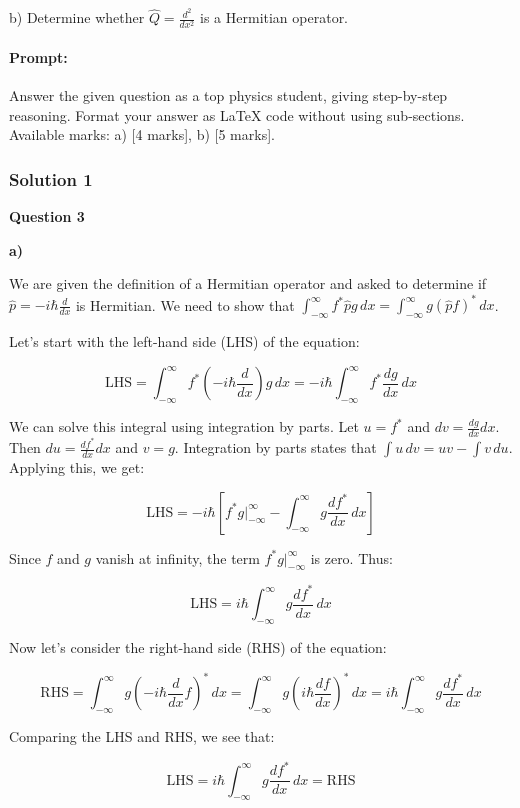 \documentclass{article}
\begin{document}
b) Determine whether $\hat{Q} = \frac{d^2}{dx^2}$ is a Hermitian operator.

\paragraph{Prompt: \\} 
Answer the given question as a top physics student, giving step-by-step reasoning. Format your answer as LaTeX code without using sub-sections. Available marks: a) [4 marks], b) [5 marks].

\subsubsection{Solution 1}
\textbf{Question 3}

\textbf{a)}

We are given the definition of a Hermitian operator and asked to determine if  $\hat{p} = -i\hbar \frac{d}{dx}$ is Hermitian.  We need to show that $\int_{-\infty}^{\infty} f^* \hat{p} g \, dx = \int_{-\infty}^{\infty} g (\hat{p} f)^* \, dx$.

Let's start with the left-hand side (LHS) of the equation:

\[
\text{LHS} = \int_{-\infty}^{\infty} f^* \left(-i\hbar \frac{d}{dx}\right) g \, dx = -i\hbar \int_{-\infty}^{\infty} f^* \frac{dg}{dx} \, dx
\]

We can solve this integral using integration by parts. Let $u = f^*$ and $dv = \frac{dg}{dx} dx$. Then $du = \frac{df^*}{dx} dx$ and $v = g$. Integration by parts states that $\int u \, dv = uv - \int v \, du$. Applying this, we get:

\[
\text{LHS} = -i\hbar \left[ f^* g \Big|_{-\infty}^{\infty} - \int_{-\infty}^{\infty} g \frac{df^*}{dx} \, dx \right]
\]

Since $f$ and $g$ vanish at infinity, the term $f^* g \Big|_{-\infty}^{\infty}$ is zero. Thus:

\[
\text{LHS} = i\hbar \int_{-\infty}^{\infty} g \frac{df^*}{dx} \, dx
\]

Now let's consider the right-hand side (RHS) of the equation:

\[
\text{RHS} = \int_{-\infty}^{\infty} g \left(-i\hbar \frac{d}{dx} f\right)^* \, dx = \int_{-\infty}^{\infty} g \left(i\hbar \frac{df}{dx}\right)^* \, dx = i\hbar \int_{-\infty}^{\infty} g \frac{df^*}{dx} \, dx
\]

Comparing the LHS and RHS, we see that:

\[
\text{LHS} = i\hbar \int_{-\infty}^{\infty} g \frac{df^*}{dx} \, dx = \text{RHS}
\]
\end{document}
